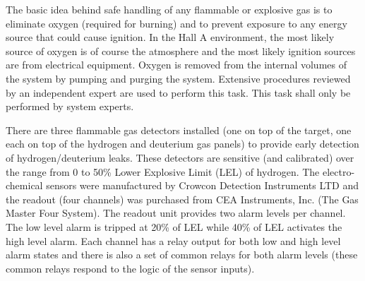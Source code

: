 \begin{safetyen}{0}{0}
The basic idea behind safe handling of any flammable or explosive
gas is to eliminate oxygen (required for burning) and to prevent exposure
to any energy source that could cause ignition. In the Hall A environment,
the most likely source of oxygen is of course the atmosphere and the
most likely ignition sources are from electrical equipment. Oxygen
is removed from the internal volumes of the system by pumping and
purging the system. Extensive procedures reviewed by an independent
expert are used to perform this task. This task shall only be performed
by system experts.

There are three flammable gas detectors installed (one on top of the
target, one each on top of the hydrogen and deuterium gas panels)
to provide early detection of hydrogen/deuterium leaks. These detectors
are sensitive (and calibrated) over the range from 0 to 50\% Lower
Explosive Limit (LEL) of hydrogen. The electro-chemical sensors were
manufactured by Crowcon Detection Instruments LTD and the readout
(four channels) was purchased from CEA Instruments, Inc. (The Gas
Master Four System). The readout unit provides two alarm levels per
channel. The low level alarm is tripped at 20\% of LEL while 40\%
of LEL activates the high level alarm. Each channel has a relay
output for both low and high level alarm states and there is also
a set of common relays for both alarm levels (these common relays
respond to the logic of the sensor
inputs). 

\end{safetyen}
